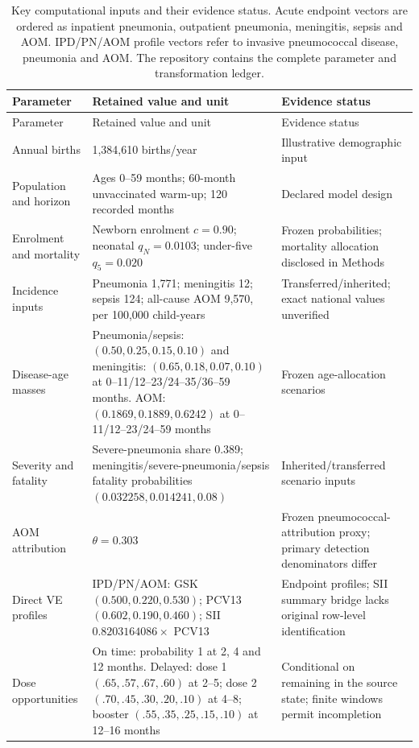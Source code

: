 \documentclass[10pt,letterpaper]{article}
\begin{document}
\begin{longtable}{L{2.8cm}L{7.7cm}L{3.8cm}}
\caption{Key computational inputs and their evidence status. Acute endpoint vectors are ordered as inpatient pneumonia, outpatient pneumonia, meningitis, sepsis and AOM. IPD/PN/AOM profile vectors refer to invasive pneumococcal disease, pneumonia and AOM. The repository contains the complete parameter and transformation ledger.}\label{tab:key_inputs}\\
\toprule Parameter & Retained value and unit & Evidence status \\\midrule
\endfirsthead
\toprule Parameter & Retained value and unit & Evidence status \\\midrule
\endhead
Annual births & 1,384,610 births/year & Illustrative demographic input \\
Population and horizon & Ages 0--59 months; 60-month unvaccinated warm-up; 120 recorded months & Declared model design \\
Enrolment and mortality & Newborn enrolment $c=0.90$; neonatal $q_N=0.0103$; under-five $q_5=0.020$ & Frozen probabilities; mortality allocation disclosed in Methods \\
Incidence inputs & Pneumonia 1,771; meningitis 12; sepsis 124; all-cause AOM 9,570, per 100,000 child-years & Transferred/inherited; exact national values unverified \\
Disease-age masses & Pneumonia/sepsis: $(0.50,0.25,0.15,0.10)$ and meningitis: $(0.65,0.18,0.07,0.10)$ at 0--11/12--23/24--35/36--59 months. AOM: $(0.1869,0.1889,0.6242)$ at 0--11/12--23/24--59 months & Frozen age-allocation scenarios \\
Severity and fatality & Severe-pneumonia share 0.389; meningitis/severe-pneumonia/sepsis fatality probabilities $(0.032258,0.014241,0.08)$ & Inherited/transferred scenario inputs \\
AOM attribution & $\theta=0.303$ & Frozen pneumococcal-attribution proxy; primary detection denominators differ \\
Direct VE profiles & IPD/PN/AOM: GSK $(0.500,0.220,0.530)$; PCV13 $(0.602,0.190,0.460)$; SII $0.8203164086\times$ PCV13 & Endpoint profiles; SII summary bridge lacks original row-level identification \\
Dose opportunities & On time: probability 1 at 2, 4 and 12 months. Delayed: dose 1 $(.65,.57,.67,.60)$ at 2--5; dose 2 $(.70,.45,.30,.20,.10)$ at 4--8; booster $(.55,.35,.25,.15,.10)$ at 12--16 months & Conditional on remaining in the source state; finite windows permit incompletion \\

\end{longtable}
\end{document}
